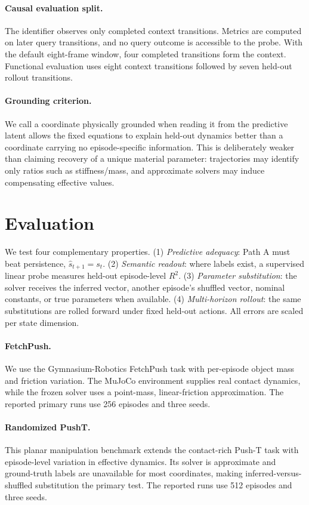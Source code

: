 \documentclass{article}
\begin{document}
\paragraph{Causal evaluation split.} The identifier observes only completed context transitions. Metrics are computed on later query transitions, and no query outcome is accessible to the probe. With the default eight-frame window, four completed transitions form the context. Functional evaluation uses eight context transitions followed by seven held-out rollout transitions.

\paragraph{Grounding criterion.} We call a coordinate physically grounded when reading it from the predictive latent allows the fixed equations to explain held-out dynamics better than a coordinate carrying no episode-specific information. This is deliberately weaker than claiming recovery of a unique material parameter: trajectories may identify only ratios such as stiffness/mass, and approximate solvers may induce compensating effective values.

\section{Evaluation}

We test four complementary properties. (1) \emph{Predictive adequacy}: Path A must beat persistence, $\hat s_{t+1}=s_t$. (2) \emph{Semantic readout}: where labels exist, a supervised linear probe measures held-out episode-level $R^2$. (3) \emph{Parameter substitution}: the solver receives the inferred vector, another episode's shuffled vector, nominal constants, or true parameters when available. (4) \emph{Multi-horizon rollout}: the same substitutions are rolled forward under fixed held-out actions. All errors are scaled per state dimension.
\label{sec:setup-benchmarks}

\paragraph{FetchPush.} We use the Gymnasium-Robotics FetchPush task with per-episode object mass and friction variation. The MuJoCo environment supplies real contact dynamics, while the frozen solver uses a point-mass, linear-friction approximation. The reported primary runs use 256 episodes and three seeds.

\paragraph{Randomized PushT.} This planar manipulation benchmark extends the contact-rich Push-T task \citep{chi2023diffusionpolicy} with episode-level variation in effective dynamics. Its solver is approximate and ground-truth labels are unavailable for most coordinates, making inferred-versus-shuffled substitution the primary test. The reported runs use 512 episodes and three seeds.
\end{document}
